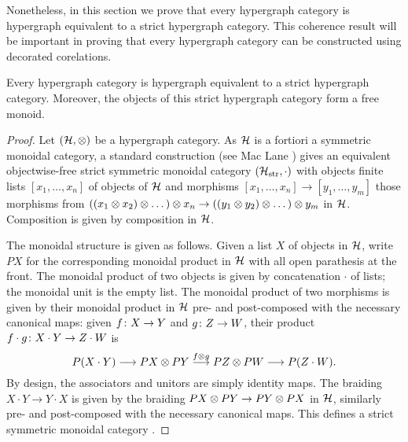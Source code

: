 Nonetheless, in this section we prove that every hypergraph category is
hypergraph equivalent to a strict hypergraph category. This coherence result
will be important in proving that every hypergraph category can be constructed
using decorated corelations.

\begin{theorem}
  Every hypergraph category is hypergraph equivalent to a strict hypergraph
  category. Moreover, the objects of this strict hypergraph category form a free
  monoid.
\end{theorem}
\begin{proof}
  Let $(\mathcal H,\otimes)$ be a hypergraph category. As $\mathcal H$ is a fortiori a
  symmetric monoidal category, a standard construction (see Mac Lane
  \cite[Theorem]{Mac98}) gives an equivalent objectwise-free strict symmetric
  monoidal category $(\mathcal H_{\mathrm{str}}, \cdot)$ with objects finite lists
  $[x_1,\dots,x_n]$ of objects of $\mathcal H$ and morphisms $[x_1,\dots,x_n] \to
  [y_1,\dots,y_m]$ those morphisms from $((x_1 \otimes x_2) \otimes \dots) \otimes x_n \to
  ((y_1 \otimes y_2) \otimes \dots) \otimes y_m$ in $\mathcal H$.  Composition is given by
  composition in $\mathcal H$.
  
  The monoidal structure is given as follows. Given a list $X$ of objects in
  $\mathcal H$, write $PX$ for the corresponding monoidal product in $\mathcal H$ with all
  open parathesis at the front.  The monoidal product of two objects is given by
  concatenation $\cdot$ of lists; the monoidal unit is the empty list. The
  monoidal product of two morphisms is given by their monoidal product in $\mathcal
  H$ pre- and post-composed with the necessary canonical maps: given $f{\colon} X
  \to Y$ and $g{\colon} Z \to W$, their product $f\cdot g{\colon} X\cdot Y \to Z \cdot
  W$ is 
  \[
    P(X \cdot Y) \longrightarrow PX \otimes PY \stackrel{f \otimes g}{\longrightarrow}
    PZ \otimes PW \longrightarrow P(Z \cdot W).
  \]
  By design, the associators and unitors are simply identity maps. The braiding
  $X \cdot Y \to Y \cdot X$ is given by the braiding $PX \otimes PY \to PY \otimes PX$
  in $\mathcal H$, similarly pre- and post-composed with the necessary canonical
  maps. This defines a strict symmetric monoidal category \cite{Mac98}.


\end{proof}
